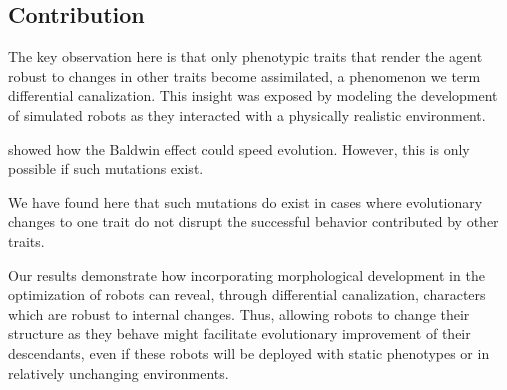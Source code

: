 \subsection{Contribution}


The key observation here is that only phenotypic traits that render the agent robust to changes in other traits become assimilated, a phenomenon we term differential canalization. 
This insight was exposed by modeling the development of simulated robots as they interacted with a physically realistic environment.

\citet{hinton1987learning} showed how the Baldwin effect could speed evolution.
However, this is only possible if such mutations exist.

We have found here that such mutations do exist in cases where evolutionary changes
to one trait do not disrupt the successful behavior contributed
by other traits.


Our results demonstrate how incorporating morphological development in the optimization of robots can reveal, through differential canalization, characters which are robust to internal changes.
Thus, allowing robots to change their structure as they behave might facilitate evolutionary improvement of their descendants, even if these robots will be deployed with static phenotypes or in relatively unchanging environments.




